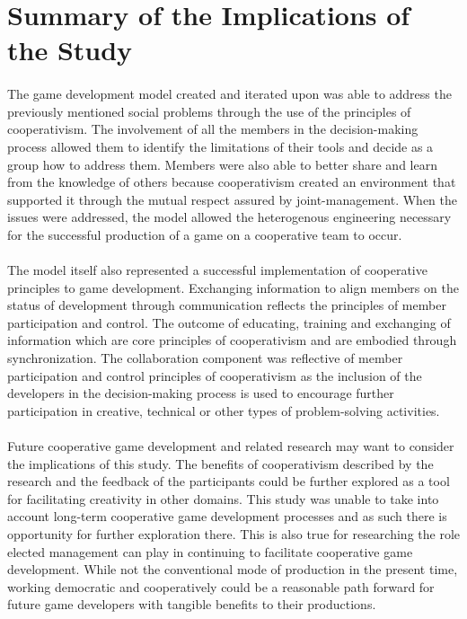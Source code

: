 \section{Summary of the Implications of the Study}

\paragraph{} The game development model created and iterated upon was able to address the previously mentioned social problems through the use of the principles of cooperativism. The involvement of all the members in the decision-making process allowed them to identify the limitations of their tools and decide as a group how to address them. Members were also able to better share and learn from the knowledge of others because cooperativism created an environment that supported it through the mutual respect assured by joint-management. When the issues were addressed, the model allowed the heterogenous engineering necessary for the successful production of a game on a cooperative team to occur.

\paragraph{} The model itself also represented a successful implementation of cooperative principles to game development. Exchanging information to align members on the status of development through communication reflects the principles of member participation and control. The outcome of educating, training and exchanging of information which are core principles of cooperativism and are embodied through synchronization. The collaboration component was reflective of member participation and control principles of cooperativism as the inclusion of the developers in the decision-making process is used to encourage further participation in creative, technical or other types of problem-solving activities.

\paragraph{} Future cooperative game development and related research may want to consider the implications of this study. The benefits of cooperativism described by the research and the feedback of the participants could be further explored as a tool for facilitating creativity in other domains. This study was unable to take into account long-term cooperative game development processes and as such there is opportunity for further exploration there. This is also true for researching the role elected management can play in continuing to facilitate cooperative game development. While not the conventional mode of production in the present time, working democratic and cooperatively could be a reasonable path forward for future game developers with tangible benefits to their productions.